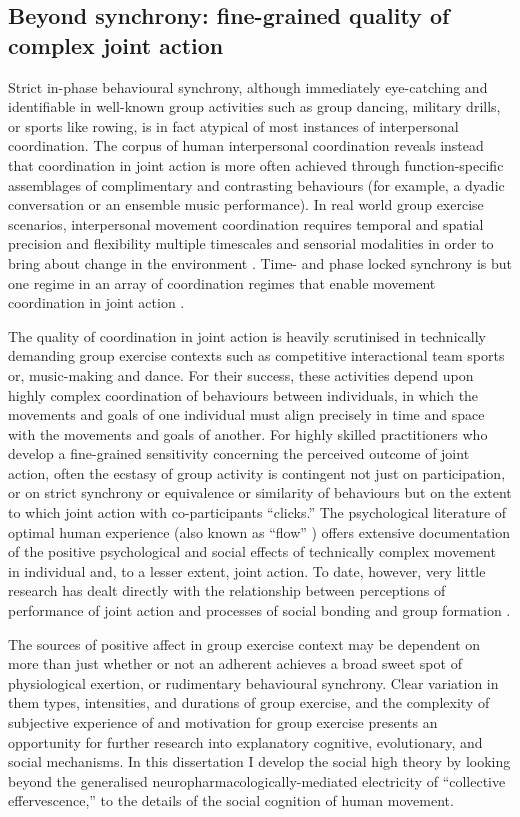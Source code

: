 \begin{CJK}{UTF8}{gbsn}
\subsection{Beyond synchrony: fine-grained quality of complex joint action}

Strict in-phase behavioural synchrony, although immediately eye-catching and identifiable in well-known group activities such as group dancing, military drills, or sports like rowing, is in fact atypical of most instances of interpersonal coordination.  The corpus of human interpersonal coordination reveals instead that coordination in joint action is more often achieved through function-specific assemblages of complimentary and contrasting behaviours (for example, a dyadic conversation or an ensemble music performance).  In real world group exercise scenarios, interpersonal movement coordination requires temporal and spatial precision and flexibility multiple timescales and sensorial modalities in order to bring about change in the environment \citep{Sebanz2006}.  Time- and phase locked synchrony is but one regime in an array of coordination regimes that enable movement coordination in joint action \citep{Kelso2013}.

The quality of coordination in joint action is heavily scrutinised in technically demanding group exercise contexts such as competitive interactional team sports or, music-making and dance.  For their success, these activities depend upon highly complex coordination of behaviours between individuals, in which the movements and goals of one individual must align precisely in time and space with the movements and goals of another.  For highly skilled practitioners who develop a fine-grained sensitivity concerning the perceived outcome of joint action, often the ecstasy of group activity is contingent not just on participation, or on strict synchrony or equivalence or similarity of behaviours but on the extent to which joint action with co-participants ``clicks.''  The psychological literature of optimal human experience (also known as ``flow'' \citep{Csikszentmihalyi1992}) offers extensive documentation of the positive psychological and social effects of technically complex movement in individual and, to a lesser extent, joint action. To date, however, very little research has dealt directly with the relationship between perceptions of performance of joint action and processes of social bonding and group formation \citep[but see][]{Marsh2009}.

The sources of positive affect in group exercise context may be dependent on more than just whether or not an adherent achieves a broad sweet spot of physiological exertion, or rudimentary behavioural synchrony. Clear variation in them types, intensities, and durations of group exercise, and the complexity of subjective experience of and motivation for group exercise presents an opportunity for further research into explanatory cognitive, evolutionary, and social mechanisms.   In this dissertation I develop the social high theory by looking beyond the generalised neuropharmacologically-mediated electricity of ``collective effervescence,'' to the details of the social cognition of human movement.



\end{CJK}
